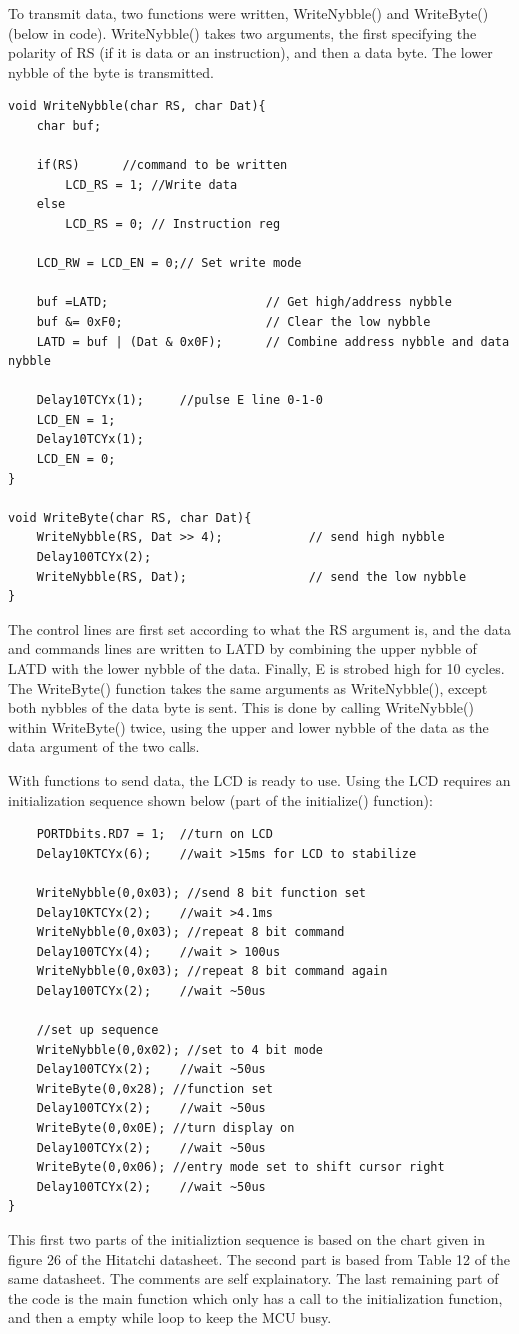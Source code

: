 \documentclass[12pt]{article}
\begin{document}
\FloatBarrier
To transmit data, two functions were written, WriteNybble() and WriteByte() (below in code). WriteNybble() takes two arguments, the first specifying the polarity of RS (if it is data or an instruction), and then a data byte. The lower nybble of the byte is transmitted.
\begin{lstlisting}
void WriteNybble(char RS, char Dat){
	char buf;
	
	if(RS)		//command to be written
		LCD_RS = 1;	//Write data
	else
		LCD_RS = 0; // Instruction reg

	LCD_RW = LCD_EN = 0;// Set write mode

	buf =LATD;                  	// Get high/address nybble
	buf &= 0xF0;                  	// Clear the low nybble
	LATD = buf | (Dat & 0x0F);   	// Combine address nybble and data nybble 
	
	Delay10TCYx(1);		//pulse E line 0-1-0
	LCD_EN = 1;
	Delay10TCYx(1);	
	LCD_EN = 0;
}

void WriteByte(char RS, char Dat){
	WriteNybble(RS, Dat >> 4);            // send high nybble
	Delay100TCYx(2);
	WriteNybble(RS, Dat);                 // send the low nybble
}
\end{lstlisting}
The control lines are first set according to what the RS argument is, and the data and commands lines are written to LATD by combining the upper nybble of LATD with the lower nybble of the data. Finally, E is strobed high for 10 cycles. The WriteByte() function takes the same arguments as WriteNybble(), except both nybbles of the data byte is sent. This is done by calling WriteNybble() within WriteByte() twice, using the upper and lower nybble of the data as the data argument of the two calls.\\\par 
With functions to send data, the LCD is ready to use. Using the LCD requires an initialization sequence shown below (part of the initialize() function):
\begin{lstlisting}
	PORTDbits.RD7 = 1; 	//turn on LCD
	Delay10KTCYx(6);	//wait >15ms for LCD to stabilize

	WriteNybble(0,0x03); //send 8 bit function set
	Delay10KTCYx(2);  	//wait >4.1ms
	WriteNybble(0,0x03); //repeat 8 bit command
	Delay100TCYx(4);	//wait > 100us
	WriteNybble(0,0x03); //repeat 8 bit command again
	Delay100TCYx(2);	//wait ~50us

	//set up sequence
	WriteNybble(0,0x02); //set to 4 bit mode
	Delay100TCYx(2);	//wait ~50us
	WriteByte(0,0x28); //function set
	Delay100TCYx(2);	//wait ~50us
	WriteByte(0,0x0E); //turn display on
	Delay100TCYx(2);	//wait ~50us
	WriteByte(0,0x06); //entry mode set to shift cursor right
	Delay100TCYx(2);	//wait ~50us
}
\end{lstlisting}
This first two parts of the initializtion sequence is based on the chart given in figure 26 of the Hitatchi datasheet. The second part is based from Table 12 of the same datasheet. The comments are self explainatory. The last remaining part of the code is the main function which only has a call to the initialization function, and then a empty while loop to keep the MCU busy.
\end{document}
